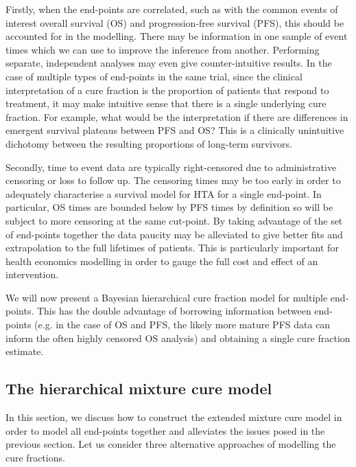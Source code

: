 \documentclass[AMA,STIX1COL]{WileyNJD-v2}
\begin{document}
Firstly, when the end-points are correlated, such as with the common events of interest overall survival (OS) and progression-free survival (PFS), this should be accounted for in the modelling.
There may be information in one sample of event times which we can use to improve the inference from another.
Performing separate, independent analyses may even give counter-intuitive results.
In the case of multiple types of end-points in the same trial, since the clinical interpretation of a cure fraction is the proportion of patients that respond to treatment,
it may make intuitive sense that there is a single underlying cure fraction.
For example, what would be the interpretation if there are differences in emergent survival plateaus between PFS and OS?
This is a clinically unintuitive dichotomy between the resulting proportions of long-term survivors.

Secondly, time to event data are typically right-censored due to administrative censoring or loss to follow up.
The censoring times may be too early in order to adequately characterise a survival model for HTA for a single end-point.
In particular, OS times are bounded below by PFS times by definition so will be subject to more censoring at the same cut-point.
By taking advantage of the set of end-points together the data paucity may be alleviated to give better fits and extrapolation to the full lifetimes of patients.
This is particularly important for health economics modelling in order to gauge the full cost and effect of an intervention.

We will now present a Bayesian hierarchical cure fraction model for multiple end-points.
This has the double advantage of borrowing information between end-points
(e.g. in the case of OS and PFS, the likely more mature PFS data can inform the often highly censored OS analysis) and obtaining a single cure fraction estimate.


%
\subsection{The hierarchical mixture cure model} \label{section:hier_model}
In this section, we discuss how to construct the extended mixture cure model in order to model all end-points together and alleviates the issues posed in the previous section.
Let us consider three alternative approaches of modelling the cure fractions. 
\end{document}
